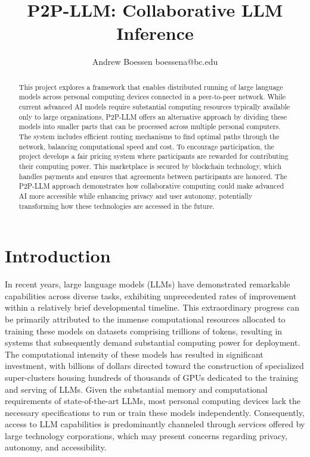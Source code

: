 \documentclass[preprint,twoside,11pt]{article}
\begin{document}
\title{P2P-LLM: Collaborative LLM Inference}

\author{\name Andrew Boessen \email boessena@bc.edu \\
}

\maketitle

\begin{abstract}%
	This project explores a framework that enables distributed running of large language models across personal computing devices connected in a peer-to-peer network.
	While current advanced AI models require substantial computing resources typically available only to large organizations,
	P2P-LLM offers an alternative approach by dividing these models into smaller parts that can be processed across multiple personal computers.
	The system includes efficient routing mechanisms to find optimal paths through the network, balancing computational speed and cost.
	To encourage participation, the project develops a fair pricing system where participants are rewarded for contributing their computing power.
	This marketplace is secured by blockchain technology, which handles payments and ensures that agreements between participants are honored.
	The P2P-LLM approach demonstrates how collaborative computing could make advanced AI more accessible while enhancing privacy and user autonomy,
	potentially transforming how these technologies are accessed in the future.
\end{abstract}

\section{Introduction}

In recent years, large language models (LLMs) have demonstrated remarkable capabilities across diverse tasks,
exhibiting unprecedented rates of improvement within a relatively brief developmental timeline.
This extraordinary progress can be primarily attributed to the immense computational resources allocated to training these models on datasets comprising
trillions of tokens, resulting in systems that subsequently demand substantial computing power for deployment.
The computational intensity of these models has resulted in significant investment,
with billions of dollars directed toward the construction of specialized super-clusters housing hundreds of thousands of GPUs dedicated to the training and serving of LLMs.
Given the substantial memory and computational requirements of state-of-the-art LLMs, most personal computing devices lack the necessary specifications to run or train these models independently.
Consequently, access to LLM capabilities is predominantly channeled through services offered by large technology corporations, which may present concerns regarding privacy, autonomy, and accessibility.
\end{document}
